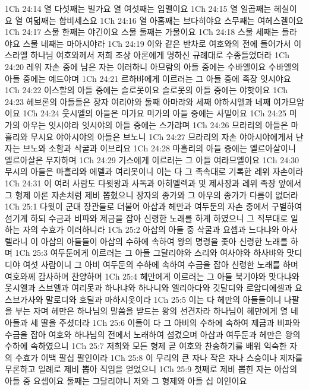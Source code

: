 1Ch 24:14  열 다섯째는 빌가요 열 여섯째는 임멜이요
1Ch 24:15  열 일곱째는 헤실이요 열 여덟째는 합비세스요
1Ch 24:16  열 아홉째는 브다히야요 스무째는 여헤스겔이요
1Ch 24:17  스물 한째는 야긴이요 스물 둘째는 가물이요
1Ch 24:18  스물 세째는 들라야요 스물 네째는 마아시야라
1Ch 24:19  이와 같은 반차로 여호와의 전에 들어가서 이스라엘 하나님 여호와께서 저희 조상 아론에게 명하신 규례대로 수종들었더라
1Ch 24:20  레위 자손 중에 남은 자는 이러하니 아므람의 아들 중에는 수바엘이요 수바엘의 아들 중에는 예드야며
1Ch 24:21  르하뱌에게 이르러는 그 아들 중에 족장 잇시야요
1Ch 24:22  이스할의 아들 중에는 슬로못이요 슬로못의 아들 중에는 야핫이요
1Ch 24:23  헤브론의 아들들은 장자 여리야와 둘째 아마랴와 세째 야하시엘과 네째 여가므암이요
1Ch 24:24  웃시엘의 아들은 미가요 미가의 아들 중에는 사밀이요
1Ch 24:25  미가의 아우는 잇시야라 잇시야의 아들 중에는 스가랴며
1Ch 24:26  므라리의 아들은 마흘리와 무시요 야아시야의 아들은 브노니
1Ch 24:27  므라리의 자손 야아시야에게서 난 자는 브노와 소함과 삭굴과 이브리요
1Ch 24:28  마흘리의 아들 중에는 엘르아살이니 엘르아살은 무자하며
1Ch 24:29  기스에게 이르러는 그 아들 여라므엘이요
1Ch 24:30  무시의 아들은 마흘리와 에델과 여리못이니 이는 다 그 족속대로 기록한 레위 자손이라
1Ch 24:31  이 여러 사람도 다윗왕과 사독과 아히멜렉과 및 제사장과 레위 족장 앞에서 그 형제 아론 자손처럼 제비 뽑혔으니 장자의 종가와 그 아우의 종가가 다름이 없더라
1Ch 25:1  다윗이 군대 장관들로 더불어 아삽과 헤만과 여두둔의 자손 중에서 구별하여 섬기게 하되 수금과 비파와 제금을 잡아 신령한 노래를 하게 하였으니 그 직무대로 일하는 자의 수효가 이러하니라
1Ch 25:2  아삽의 아들 중 삭굴과 요셉과 느다냐와 아사렐라니 이 아삽의 아들들이 아삽의 수하에 속하여 왕의 명령을 좇아 신령한 노래를 하며
1Ch 25:3  여두둔에게 이르러는 그 아들 그달리야와 스리와 여사야와 하사뱌와 맛디디야 여섯 사람이니 그 아비 여두둔의 수하에 속하여 수금을 잡아 신령한 노래를 하며 여호와께 감사하며 찬양하며
1Ch 25:4  헤만에게 이르러는 그 아들 북기야와 맛다냐와 웃시엘과 스브엘과 여리못과 하나냐와 하나니와 엘리아다와 깃달디와 로암디에셀과 요스브가사와 말로디와 호딜과 마하시옷이라
1Ch 25:5  이는 다 헤만의 아들들이니 나팔을 부는 자며 헤만은 하나님의 말씀을 받드는 왕의 선견자라 하나님이 헤만에게 열 네 아들과 세 딸을 주셨더라
1Ch 25:6  이들이 다 그 아비의 수하에 속하여 제금과 비파와 수금을 잡아 여호와 하나님의 전에서 노래하여 섬겼으며 아삽과 여두둔과 헤만은 왕의 수하에 속하였으니
1Ch 25:7  저희와 모든 형제 곧 여호와 찬송하기를 배워 익숙한 자의 수효가 이백 팔십 팔인이라
1Ch 25:8  이 무리의 큰 자나 작은 자나 스승이나 제자를 무론하고 일례로 제비 뽑아 직임을 얻었으니
1Ch 25:9  첫째로 제비 뽑힌 자는 아삽의 아들 중 요셉이요 둘째는 그달리야니 저와 그 형제와 아들 십 이인이요
